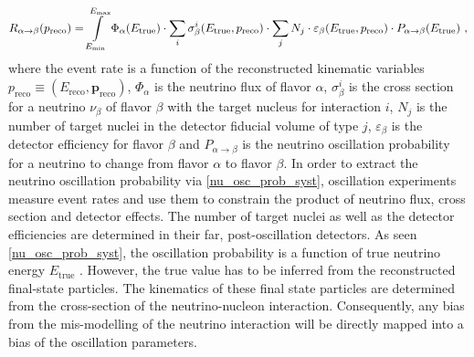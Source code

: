 %
\vspace{-3mm}
    \begin{align} \label{nu_osc_prob_syst}
        R_{\alpha\rightarrow\beta}(p_\text{reco}) = \int\displaylimits_{E_\text{min}}^{E_\text{max}} \Phi_\alpha(E_\text{true}) \cdot \sum_{i} \sigma^i_\beta(E_\text{true}, p_\text{reco}) \cdot \sum_{j} N_j \cdot \varepsilon_\beta(E_\text{true}, p_\text{reco}) \cdot P_{\alpha\rightarrow\beta}(E_\text{true}) \ ,
    \end{align}
where the event rate is a function of the reconstructed kinematic variables $p_\text{reco} \equiv (E_\text{reco}, \mathbf{p}_\text{reco})$, $\Phi_\alpha$ is the neutrino flux of flavor $\alpha$, $\sigma^i_\beta$ is the cross section for a neutrino $\nu_\beta$ of flavor $\beta$ with the target nucleus for interaction $i$, $N_j$ is the number of target nuclei in the detector fiducial volume of type $j$, $\varepsilon_\beta$ is the detector efficiency for flavor $\beta$ and $P_{\alpha\rightarrow\beta}$ is the neutrino oscillation probability for a neutrino to change from flavor $\alpha$ to flavor $\beta$. In order to extract the neutrino oscillation probability via \cref{nu_osc_prob_syst}, oscillation experiments measure %
event rates and use them to 
constrain the product of neutrino flux, cross section and detector effects. The number of target nuclei as well as the detector efficiencies are determined in their far, post-oscillation detectors. As seen \cref{nu_osc_prob_syst}, the oscillation probability is a function of true neutrino energy $E_\text{true}$ \cite{ALVAREZRUSO20181}. However, the true value has to be inferred from the reconstructed final-state particles. The kinematics of these final state particles are determined from the cross-section of the neutrino-nucleon interaction. Consequently, any bias from the mis-modelling of the neutrino interaction will be directly mapped into a bias of the oscillation parameters.
